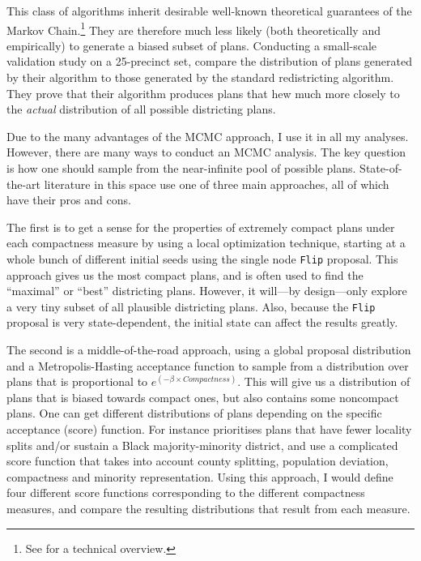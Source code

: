\documentclass[]{article}
\begin{document}
This class of algorithms inherit desirable well-known theoretical
guarantees of the Markov Chain.\footnote{See \cite{ddj2019recom} for a
  technical overview.} They are therefore much less likely (both
theoretically and empirically) to generate a biased subset of plans.
Conducting a small-scale validation study on a 25-precinct set,
\citeauthor{fifieldwp} compare the distribution of plans generated by
their algorithm to those generated by the standard redistricting
algorithm. They prove that their algorithm produces plans that hew much
more closely to the \emph{actual} distribution of all possible
districting plans.

Due to the many advantages of the MCMC approach, I use it in all my
analyses. However, there are many ways to conduct an MCMC analysis. The
key question is how one should sample from the near-infinite pool of
possible plans. State-of-the-art literature in this space use one of
three main approaches, all of which have their pros and cons.

The first is to get a sense for the properties of extremely compact
plans under each compactness measure by using a local optimization
technique, starting at a whole bunch of different initial seeds using
the single node \texttt{Flip} proposal. This approach gives us the most
compact plans, and is often used to find the ``maximal'' or ``best''
districting plans. However, it will---by design---only explore a very
tiny subset of all plausible districting plans. Also, because the
\texttt{Flip} proposal is very state-dependent, the initial state can
affect the results greatly.

The second is a middle-of-the-road approach, using a global proposal
distribution and a Metropolis-Hasting acceptance function to sample from
a distribution over plans that is proportional to
\(e^(-\beta \times Compactness)\). This will give us a distribution of
plans that is biased towards compact ones, but also contains some
noncompact plans. One can get different distributions of plans depending
on the specific acceptance (score) function. For instance
\cite{dd2019va} prioritises plans that have fewer locality splits and/or
sustain a Black majority-minority district, and \cite{h2018} use a
complicated score function that takes into account county splitting,
population deviation, compactness and minority representation. Using
this approach, I would define four different score functions
corresponding to the different compactness measures, and compare the
resulting distributions that result from each measure.
\end{document}
